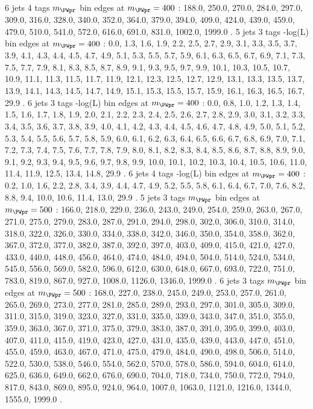6 jets 4 \Pqb tags $m_{\PWpr}$ bin edges at $m_{\PWpr}=400$ \GeV:
188.0, 250.0, 270.0, 284.0, 297.0, 309.0, 316.0, 328.0, 340.0, 352.0, 364.0, 379.0, 394.0, 409.0, 424.0, 439.0, 459.0, 479.0, 510.0, 541.0, 572.0, 616.0, 691.0, 831.0, 1002.0, 1999.0 .
5 jets 3 \Pqb tags -log(L) bin edges at $m_{\PWpr}=400$ \GeV:
0.0, 1.3, 1.6, 1.9, 2.2, 2.5, 2.7, 2.9, 3.1, 3.3, 3.5, 3.7, 3.9, 4.1, 4.3, 4.4, 4.5, 4.7, 4.9, 5.1, 5.3, 5.5, 5.7, 5.9, 6.1, 6.3, 6.5, 6.7, 6.9, 7.1, 7.3, 7.5, 7.7, 7.9, 8.1, 8.3, 8.5, 8.7, 8.9, 9.1, 9.3, 9.5, 9.7, 9.9, 10.1, 10.3, 10.5, 10.7, 10.9, 11.1, 11.3, 11.5, 11.7, 11.9, 12.1, 12.3, 12.5, 12.7, 12.9, 13.1, 13.3, 13.5, 13.7, 13.9, 14.1, 14.3, 14.5, 14.7, 14.9, 15.1, 15.3, 15.5, 15.7, 15.9, 16.1, 16.3, 16.5, 16.7, 29.9 .
6 jets 3 \Pqb tags -log(L) bin edges at $m_{\PWpr}=400$ \GeV:
0.0, 0.8, 1.0, 1.2, 1.3, 1.4, 1.5, 1.6, 1.7, 1.8, 1.9, 2.0, 2.1, 2.2, 2.3, 2.4, 2.5, 2.6, 2.7, 2.8, 2.9, 3.0, 3.1, 3.2, 3.3, 3.4, 3.5, 3.6, 3.7, 3.8, 3.9, 4.0, 4.1, 4.2, 4.3, 4.4, 4.5, 4.6, 4.7, 4.8, 4.9, 5.0, 5.1, 5.2, 5.3, 5.4, 5.5, 5.6, 5.7, 5.8, 5.9, 6.0, 6.1, 6.2, 6.3, 6.4, 6.5, 6.6, 6.7, 6.8, 6.9, 7.0, 7.1, 7.2, 7.3, 7.4, 7.5, 7.6, 7.7, 7.8, 7.9, 8.0, 8.1, 8.2, 8.3, 8.4, 8.5, 8.6, 8.7, 8.8, 8.9, 9.0, 9.1, 9.2, 9.3, 9.4, 9.5, 9.6, 9.7, 9.8, 9.9, 10.0, 10.1, 10.2, 10.3, 10.4, 10.5, 10.6, 11.0, 11.4, 11.9, 12.5, 13.4, 14.8, 29.9 .
6 jets 4 \Pqb tags -log(L) bin edges at $m_{\PWpr}=400$ \GeV:
0.2, 1.0, 1.6, 2.2, 2.8, 3.4, 3.9, 4.4, 4.7, 4.9, 5.2, 5.5, 5.8, 6.1, 6.4, 6.7, 7.0, 7.6, 8.2, 8.8, 9.4, 10.0, 10.6, 11.4, 13.0, 29.9 .
5 jets 3 \Pqb tags $m_{\PWpr}$ bin edges at $m_{\PWpr}=500$ \GeV:
166.0, 218.0, 229.0, 236.0, 243.0, 249.0, 254.0, 259.0, 263.0, 267.0, 271.0, 275.0, 279.0, 283.0, 287.0, 291.0, 294.0, 298.0, 302.0, 306.0, 310.0, 314.0, 318.0, 322.0, 326.0, 330.0, 334.0, 338.0, 342.0, 346.0, 350.0, 354.0, 358.0, 362.0, 367.0, 372.0, 377.0, 382.0, 387.0, 392.0, 397.0, 403.0, 409.0, 415.0, 421.0, 427.0, 433.0, 440.0, 448.0, 456.0, 464.0, 474.0, 484.0, 494.0, 504.0, 514.0, 524.0, 534.0, 545.0, 556.0, 569.0, 582.0, 596.0, 612.0, 630.0, 648.0, 667.0, 693.0, 722.0, 751.0, 783.0, 819.0, 867.0, 927.0, 1008.0, 1126.0, 1346.0, 1999.0 .
6 jets 3 \Pqb tags $m_{\PWpr}$ bin edges at $m_{\PWpr}=500$ \GeV:
168.0, 227.0, 238.0, 245.0, 249.0, 253.0, 257.0, 261.0, 265.0, 269.0, 273.0, 277.0, 281.0, 285.0, 289.0, 293.0, 297.0, 301.0, 305.0, 309.0, 311.0, 315.0, 319.0, 323.0, 327.0, 331.0, 335.0, 339.0, 343.0, 347.0, 351.0, 355.0, 359.0, 363.0, 367.0, 371.0, 375.0, 379.0, 383.0, 387.0, 391.0, 395.0, 399.0, 403.0, 407.0, 411.0, 415.0, 419.0, 423.0, 427.0, 431.0, 435.0, 439.0, 443.0, 447.0, 451.0, 455.0, 459.0, 463.0, 467.0, 471.0, 475.0, 479.0, 484.0, 490.0, 498.0, 506.0, 514.0, 522.0, 530.0, 538.0, 546.0, 554.0, 562.0, 570.0, 578.0, 586.0, 594.0, 604.0, 614.0, 625.0, 636.0, 649.0, 662.0, 676.0, 690.0, 704.0, 718.0, 734.0, 750.0, 772.0, 794.0, 817.0, 843.0, 869.0, 895.0, 924.0, 964.0, 1007.0, 1063.0, 1121.0, 1216.0, 1344.0, 1555.0, 1999.0 .
